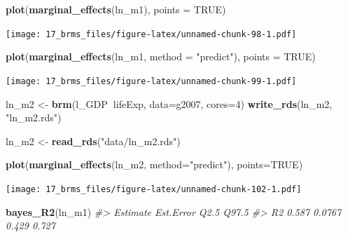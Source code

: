\documentclass[]{book}
\newenvironment{Shaded}{\begin{snugshade}}{\end{snugshade}}
\newcommand{\KeywordTok}[1]{\textcolor[rgb]{0.13,0.29,0.53}{\textbf{#1}}}
\newcommand{\DataTypeTok}[1]{\textcolor[rgb]{0.13,0.29,0.53}{#1}}
\newcommand{\DecValTok}[1]{\textcolor[rgb]{0.00,0.00,0.81}{#1}}
\newcommand{\StringTok}[1]{\textcolor[rgb]{0.31,0.60,0.02}{#1}}
\newcommand{\CommentTok}[1]{\textcolor[rgb]{0.56,0.35,0.01}{\textit{#1}}}
\newcommand{\OtherTok}[1]{\textcolor[rgb]{0.56,0.35,0.01}{#1}}
\newcommand{\OperatorTok}[1]{\textcolor[rgb]{0.81,0.36,0.00}{\textbf{#1}}}
\newcommand{\NormalTok}[1]{#1}
\begin{document}
\begin{Shaded}
\begin{Highlighting}[]
\KeywordTok{plot}\NormalTok{(}\KeywordTok{marginal_effects}\NormalTok{(ln_m1), }\DataTypeTok{points =} \OtherTok{TRUE}\NormalTok{)}
\end{Highlighting}
\end{Shaded}

\texttt{[image: 17\_brms\_files/figure-latex/unnamed-chunk-98-1.pdf]}

\begin{Shaded}
\begin{Highlighting}[]
\KeywordTok{plot}\NormalTok{(}\KeywordTok{marginal_effects}\NormalTok{(ln_m1, }\DataTypeTok{method =} \StringTok{"predict"}\NormalTok{), }\DataTypeTok{points =} \OtherTok{TRUE}\NormalTok{)}
\end{Highlighting}
\end{Shaded}

\texttt{[image: 17\_brms\_files/figure-latex/unnamed-chunk-99-1.pdf]}

\begin{Shaded}
\begin{Highlighting}[]
\NormalTok{ln_m2 <-}\StringTok{ }\KeywordTok{brm}\NormalTok{(l_GDP}\OperatorTok{~}\NormalTok{lifeExp, }\DataTypeTok{data=}\NormalTok{g2007, }\DataTypeTok{cores=}\DecValTok{4}\NormalTok{)}
\KeywordTok{write_rds}\NormalTok{(ln_m2, }\StringTok{"ln_m2.rds"}\NormalTok{)}
\end{Highlighting}
\end{Shaded}

\begin{Shaded}
\begin{Highlighting}[]
\NormalTok{ln_m2 <-}\StringTok{ }\KeywordTok{read_rds}\NormalTok{(}\StringTok{"data/ln_m2.rds"}\NormalTok{)}
\end{Highlighting}
\end{Shaded}

\begin{Shaded}
\begin{Highlighting}[]
\KeywordTok{plot}\NormalTok{(}\KeywordTok{marginal_effects}\NormalTok{(ln_m2, }\DataTypeTok{method=}\StringTok{"predict"}\NormalTok{), }\DataTypeTok{points=}\OtherTok{TRUE}\NormalTok{)}
\end{Highlighting}
\end{Shaded}

\texttt{[image: 17\_brms\_files/figure-latex/unnamed-chunk-102-1.pdf]}

\begin{Shaded}
\begin{Highlighting}[]
\KeywordTok{bayes_R2}\NormalTok{(ln_m1)}
\CommentTok{#>    Estimate Est.Error  Q2.5 Q97.5}
\CommentTok{#> R2    0.587    0.0767 0.429 0.727}
\end{Highlighting}
\end{Shaded}
\end{document}
